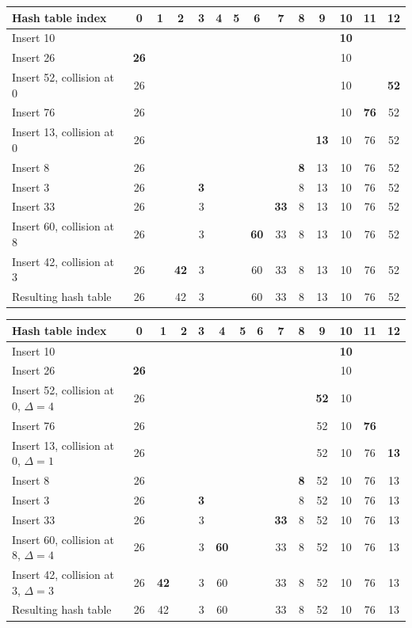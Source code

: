\begin{center}
{\footnotesize
\begin{tabular}{|l|c|c|c|c|c|c|c|c|c|c|c|c|c|}
\hline
Hash table index& 0& 1& 2& 3& 4& 5& 6& 7& 8& 9& 10& 11& 12 \\
\hline
Insert 10&&&&&&&&&&& \textbf{10}&& \\
\hline
Insert 26& \textbf{26}&&&&&&&&&& 10&& \\
\hline
Insert 52, collision at 0& 26&&&&&&&&&& 10&& \textbf{52} \\
\hline
Insert 76& 26&&&&&&&&&& 10& \textbf{76}& 52 \\
\hline
Insert 13, collision at 0& 26&&&&&&&&& \textbf{13}& 10& 76& 52 \\
\hline
Insert 8& 26&&&&&&&& \textbf{8}& 13& 10& 76& 52 \\
\hline
Insert 3& 26&&& \textbf{3}&&&&& 8& 13& 10& 76& 52 \\
\hline
Insert 33& 26&&& 3&&&& \textbf{33}& 8& 13& 10& 76& 52 \\
\hline
Insert 60, collision at 8& 26&&& 3&&& \textbf{60}& 33& 8& 13& 10& 76& 52 \\
\hline
Insert 42, collision at 3& 26&& \textbf{42}& 3&&& 60& 33& 8& 13& 10& 76& 52 \\
\hline
Resulting hash table& 26&& 42& 3&&& 60& 33& 8& 13& 10& 76& 52 \\
\hline
\end{tabular}
}
\end{center}


\begin{center}
{\footnotesize
\begin{tabular}{|l|c|c|c|c|c|c|c|c|c|c|c|c|c|}
\hline
Hash table index& 0& 1& 2& 3& 4& 5& 6& 7& 8& 9& 10& 11& 12 \\
\hline
Insert 10&&&&&&&&&&& \textbf{10}&& \\
\hline
Insert 26& \textbf{26}&&&&&&&&&& 10&& \\
\hline
Insert 52, collision at 0, \(\Delta=4\)& 26&&&&&&&&& \textbf{52}& 10&& \\
\hline
Insert 76& 26&&&&&&&&& 52& 10& \textbf{76}& \\
\hline
Insert 13, collision at 0, \(\Delta=1\)& 26&&&&&&&&& 52& 10& 76& \textbf{13}\\
\hline
Insert 8& 26&&&&&&&& \textbf{8}& 52& 10& 76& 13\\
\hline
Insert 3& 26&&& \textbf{3}&&&&& 8& 52& 10& 76& 13\\
\hline
Insert 33& 26&&& 3&&&& \textbf{33}& 8& 52& 10& 76& 13\\
\hline
Insert 60, collision at 8, \(\Delta=4\)& 26&&& 3& \textbf{60}&&& 33& 8& 52& 10& 76& 13\\
\hline
Insert 42, collision at 3, \(\Delta=3\)& 26& \textbf{42}&& 3& 60&&& 33& 8& 52& 10& 76& 13\\
\hline
Resulting hash table& 26& 42&& 3& 60&&& 33& 8& 52& 10& 76& 13\\
\hline
\end{tabular}
}
\end{center}

